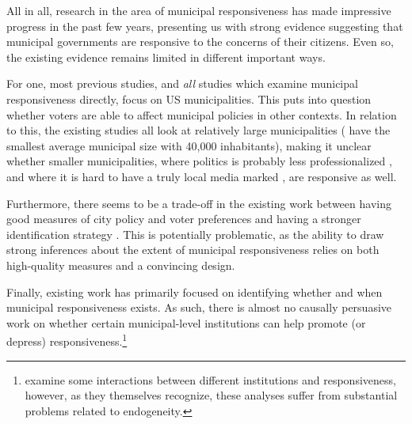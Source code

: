 \documentclass[a4paper,12pt]{article}
\begin{document}

All in all, research in the area of municipal responsiveness has made impressive progress in the past few years, presenting us with strong evidence suggesting that municipal governments are responsive to the concerns of their citizens. Even so, the existing evidence remains limited in different important ways.

For one, most previous studies, and \textit{all} studies which examine municipal responsiveness directly, focus on US municipalities. This puts into question whether voters are able to affect municipal policies in other contexts. In relation to this, the existing studies all look at relatively large municipalities (\citeauthor{einstein2016pushing} have the smallest average municipal size with 40,000 inhabitants), making it unclear whether smaller municipalities, where politics is probably less professionalized \cite{lewis2011size}, and where it is hard to have a truly local media marked \cite{snyder2010press}, are responsive as well.

Furthermore, there seems to be a trade-off in the existing work between having good measures of city policy and voter preferences \citep[cf.][]{tausanovitch2014representation} and having a stronger identification strategy \citep[cf.][]{sances2017voters}. This is potentially problematic, as the ability to draw strong inferences about the extent of municipal responsiveness relies on both high-quality measures and a convincing design.

Finally, existing work has primarily focused on identifying whether and when municipal responsiveness exists. As such, there is almost no causally persuasive work on whether certain municipal-level institutions can help promote (or depress) responsiveness.\footnote{\cite{tausanovitch2014representation} examine some interactions between different institutions and responsiveness, however, as they themselves recognize, these analyses suffer from substantial problems related to endogeneity.} 
\end{document}
